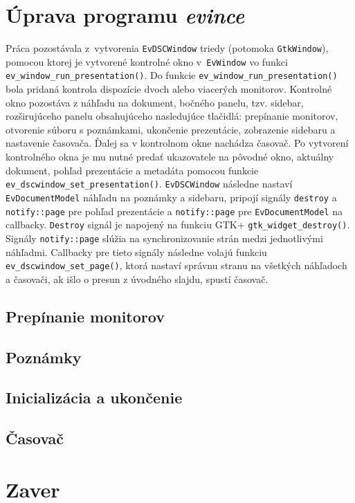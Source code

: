 \documentclass[12pt,oneside,final]{fithesis2}
\begin{document}
\chapter{Úprava programu \emph{evince}}
Práca pozostávala z~vytvorenia \texttt{EvDSCWindow} triedy (potomoka \texttt{GtkWindow}), pomocou ktorej je vytvorené kontrolné okno v~\texttt{EvWindow} vo funkci \texttt{ev\_window\_run\_presentation()}. Do funkcie \texttt{ev\_window\_run\_presentation()} bola pridaná kontrola dispozície dvoch alebo viacerých monitorov. Kontrolné okno pozostáva z náhľadu na dokument, bočného panelu, tzv. sidebar, rozširujúceho panelu obsahujúceho nasledujúce tlačidlá: prepínanie monitorov, otvorenie súboru s poznámkami, ukončenie prezentácie, zobrazenie sidebaru a nastavenie časovača. Ďalej sa v kontrolnom okne nachádza časovač. Po vytvorení kontrolného okna je mu nutné predať ukazovatele na pôvodné okno, aktuálny dokument, pohľad prezentácie a metadáta pomocou funkcie \texttt{ev\_dscwindow\_set\_presentation()}. \texttt{EvDSCWindow} následne nastaví \texttt{EvDocumentModel} náhľadu na poznámky a sidebaru, pripojí signály \texttt{destroy} a \texttt{notify::page} pre pohľad prezentácie a \texttt{notify::page} pre \texttt{EvDocumentModel} na callbacky. \texttt{Destroy} signál je napojený na funkciu GTK+ \texttt{gtk\_widget\_destroy()}. Signály \texttt{notify::page} slúžia na synchronizovanie strán medzi jednotlivými náhľadmi. Callbacky pre tieto signály následne volajú funkciu \texttt{ev\_dscwindow\_set\_page()}, ktorá nastaví správnu stranu na všetkých náhľadoch a časovači, ak išlo o presun z úvodného slajdu, spustí časovač.
\section{Prepínanie monitorov}
\section{Poznámky}
\section{Inicializácia a ukončenie}
\section{Časovač}

\chapter{Zaver}



\end{document}
